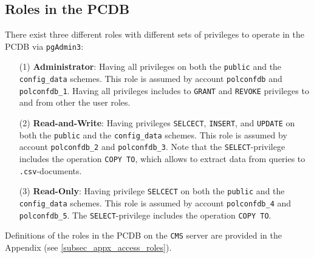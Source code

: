 \subsection{Roles in the PCDB}\label{subsec_access_roles}
There exist three different roles with different sets of privileges to operate in the PCDB via \texttt{pgAdmin3}:
\begin{itemize}
\item[(1)]{{\bf Administrator}: Having all privileges on both the \texttt{public} and the \texttt{config\_data} schemes. 
This role is assumed by account \texttt{polconfdb} and \texttt{polconfdb\_1}. 
Having all privileges includes to \texttt{GRANT} and \texttt{REVOKE} privileges to and from other the user roles.}

\item[(2)]{{\bf Read-and-Write}: Having privileges  \texttt{SELCECT},  \texttt{INSERT}, and  \texttt{UPDATE} on both the \texttt{public} and the \texttt{config\_data} schemes. 
This role is assumed by account \texttt{polconfdb\_2} and \texttt{polconfdb\_3}.
Note that the  \texttt{SELECT}-privilege includes the operation  \texttt{COPY TO}, which allows to extract data from queries to  \texttt{.csv}-documents.}

\item[(3)]{{\bf Read-Only}: Having privilege \texttt{SELCECT} on both the \texttt{public} and the \texttt{config\_data} schemes. 
This role is assumed by account \texttt{polconfdb\_4} and \texttt{polconfdb\_5}.
The \texttt{SELECT}-privilege includes the operation  \texttt{COPY TO}.}
\end{itemize}

Definitions of the roles in the PCDB on the \texttt{CMS} server are provided in the Appendix (see \ref{subsec_appx_access_roles}).